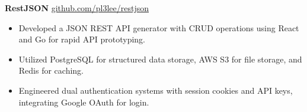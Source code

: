 \textbf{RestJSON} \hfill \href{https://github.com/pl3lee/restjson}{github.com/pl3lee/restjson} \\
\vspace{-9pt}
\begin{itemize}
  \item Developed a JSON REST API generator with CRUD operations using React and Go for rapid API prototyping.
  \item Utilized PostgreSQL for structured data storage, AWS S3 for file storage, and Redis for caching.
  \item Engineered dual authentication systems with session cookies and API keys, integrating Google OAuth for login.
\end{itemize}